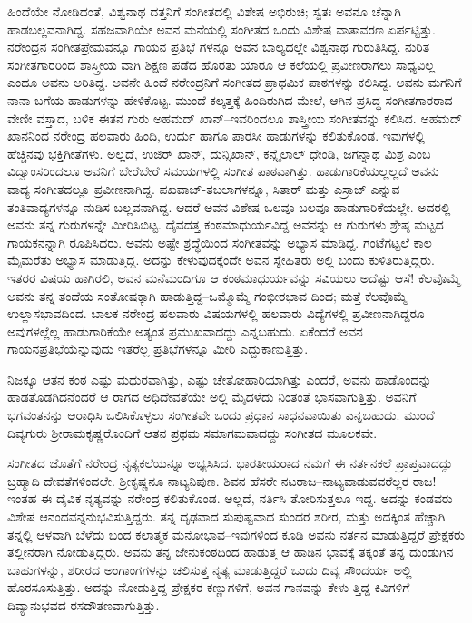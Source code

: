 ಹಿಂದೆಯೇ ನೋಡಿದಂತೆ, ವಿಶ್ವನಾಥ ದತ್ತನಿಗೆ ಸಂಗೀತದಲ್ಲಿ ವಿಶೇಷ ಅಭಿರುಚಿ; ಸ್ವತಃ ಅವನೂ ಚೆನ್ನಾಗಿ ಹಾಡಬಲ್ಲವನಾಗಿದ್ದ. ಸಹಜವಾಗಿಯೇ ಅವನ ಮನೆಯಲ್ಲಿ ಸಂಗೀತದ ಒಂದು ವಿಶೇಷ ವಾತಾವರಣ ಏರ್ಪಟ್ಟಿತ್ತು. ನರೇಂದ್ರನ ಸಂಗೀತಪ್ರೇಮವನ್ನೂ ಗಾಯನ ಪ್ರತಿಭೆ ಗಳನ್ನೂ ಅವನ ಬಾಲ್ಯದಲ್ಲೇ ವಿಶ್ವನಾಥ ಗುರುತಿಸಿದ್ದ. ನುರಿತ ಸಂಗೀತಗಾರರಿಂದ ಶಾಸ್ತ್ರೀಯ ವಾಗಿ ಶಿಕ್ಷಣ ಪಡೆದ ಹೊರತು ಯಾರೂ ಆ ಕಲೆಯಲ್ಲಿ ಪ್ರವೀಣರಾಗಲು ಸಾಧ್ಯವಿಲ್ಲ ಎಂದೂ ಅವನು ಅರಿತಿದ್ದ. ಅವನೇ ಹಿಂದೆ ನರೇಂದ್ರನಿಗೆ ಸಂಗೀತದ ಪ್ರಾಥಮಿಕ ಪಾಠಗಳನ್ನು ಕಲಿಸಿದ್ದ. ಅವನು ಮಗನಿಗೆ ನಾನಾ ಬಗೆಯ ಹಾಡುಗಳನ್ನು ಹೇಳಿಕೊಟ್ಟ. ಮುಂದೆ ಕಲ್ಕತ್ತಕ್ಕೆ ಹಿಂದಿರುಗಿದ ಮೇಲೆ, ಆಗಿನ ಪ್ರಸಿದ್ಧ ಸಂಗೀತಗಾರರಾದ ವೇಣೀ ವಸ್ತಾದ, ಬಳಿಕ ಈತನ ಗುರು ಅಹಮದ್ ಖಾನ್​–ಇವರಿಂದಲೂ ಶಾಸ್ತ್ರೀಯ ಸಂಗೀತವನ್ನು ಕಲಿಸಿದ. ಅಹಮದ್ ಖಾನನಿಂದ ನರೇಂದ್ರ ಹಲವಾರು ಹಿಂದಿ, ಉರ್ದು ಹಾಗೂ ಪಾರಸೀ ಹಾಡುಗಳನ್ನು ಕಲಿತುಕೊಂಡ. ಇವುಗಳಲ್ಲಿ ಹೆಚ್ಚಿನವು ಭಕ್ತಿಗೀತೆಗಳು. ಅಲ್ಲದೆ, ಉಜಿರ್ ಖಾನ್, ದುನ್ನಿಖಾನ್, ಕನ್ನೈಲಾಲ್ ಧೇಂಡಿ, ಜಗನ್ನಾಥ ಮಿಶ್ರ ಎಂಬ ವಿದ್ವಾಂಸರಿಂದಲೂ ಅವನಿಗೆ ಬೇರೆಬೇರೆ ಸಮಯಗಳಲ್ಲಿ ಸಂಗೀತ ಪಾಠವಾಗಿತ್ತು. ಹಾಡುಗಾರಿಕೆಯಲ್ಲಲ್ಲದೆ ಅವನು ವಾದ್ಯ ಸಂಗೀತದಲ್ಲೂ ಪ್ರವೀಣನಾಗಿದ್ದ. ಪಖವಾಜ್​-ತಬಲಾಗಳನ್ನೂ, ಸಿತಾರ್ ಮತ್ತು ಎಸ್ರಾಜ್ ಎನ್ನುವ ತಂತಿವಾದ್ಯಗಳನ್ನೂ ನುಡಿಸ ಬಲ್ಲವನಾಗಿದ್ದ. ಆದರೆ ಅವನ ವಿಶೇಷ ಒಲವೂ ಬಲವೂ ಹಾಡುಗಾರಿಕೆಯಲ್ಲೇ. ಅದರಲ್ಲಿ ಅವನು ತನ್ನ ಗುರುಗಳನ್ನೇ ಮೀರಿಸಿಬಿಟ್ಟ. ದೈವದತ್ತ ಕಂಠಮಾಧುರ್ಯವಿದ್ದ ಅವನನ್ನು ಆ ಗುರುಗಳು ಶ್ರೇಷ್ಠ ಮಟ್ಟದ ಗಾಯಕನನ್ನಾಗಿ ರೂಪಿಸಿದರು. ಅವನು ಅಷ್ಟೇ ಶ್ರದ್ಧೆಯಿಂದ ಸಂಗೀತವನ್ನು ಅಭ್ಯಾಸ ಮಾಡಿದ್ದ. ಗಂಟೆಗಟ್ಟಲೆ ಕಾಲ ಮೈಮರೆತು ಅಭ್ಯಾಸ ಮಾಡುತ್ತಿದ್ದ. ಅದನ್ನು ಕೇಳುವುದಕ್ಕೆಂದೇ ಅವನ ಸ್ನೇಹಿತರು ಅಲ್ಲಿ ಬಂದು ಕುಳಿತಿರುತ್ತಿದ್ದರು. ಇತರರ ವಿಷಯ ಹಾಗಿರಲಿ, ಅವನ ಮನೆಮಂದಿಗೂ ಆ ಕಂಠಮಾಧುರ್ಯವನ್ನು ಸವಿಯಲು ಅದೆಷ್ಟು ಆಸೆ! ಕೆಲವೊಮ್ಮೆ ಅವನು ತನ್ನ ತಂದೆಯ ಸಂತೋಷಕ್ಕಾಗಿ ಹಾಡುತ್ತಿದ್ದ–ಒಮ್ಮೊಮ್ಮೆ ಗಂಭೀರಭಾವ ದಿಂದ; ಮತ್ತೆ ಕೆಲವೊಮ್ಮೆ ಉಲ್ಲಾಸಭಾವದಿಂದ. ಬಾಲಕ ನರೇಂದ್ರ ಹಲವಾರು ವಿಷಯಗಳಲ್ಲಿ ಹಲವಾರು ವಿದ್ಯೆಗಳಲ್ಲಿ ಪ್ರವೀಣನಾಗಿದ್ದರೂ ಅವುಗಳಲ್ಲೆಲ್ಲ ಹಾಡುಗಾರಿಕೆಯೇ ಅತ್ಯಂತ ಪ್ರಮುಖವಾದದ್ದು ಎನ್ನಬಹುದು. ಏಕೆಂದರೆ ಅವನ ಗಾಯನಪ್ರತಿಭೆಯೆನ್ನುವುದು ಇತರೆಲ್ಲ ಪ್ರತಿಭೆಗಳನ್ನೂ ಮೀರಿ ಎದ್ದುಕಾಣುತ್ತಿತ್ತು.

ನಿಜಕ್ಕೂ ಆತನ ಕಂಠ ಎಷ್ಟು ಮಧುರವಾಗಿತ್ತು, ಎಷ್ಟು ಚೇತೋಹಾರಿಯಾಗಿತ್ತು ಎಂದರೆ, ಅವನು ಹಾಡೊಂದನ್ನು ಹಾಡತೊಡಗಿದನೆಂದರೆ ಆ ರಾಗದ ಅಧಿದೇವತೆಯೇ ಅಲ್ಲಿ ಮೈದಳೆದು ನಿಂತಂತೆ ಭಾಸವಾಗುತ್ತಿತ್ತು. ಅವನಿಗೆ ಭಗವಂತನನ್ನು ಆರಾಧಿಸಿ ಒಲಿಸಿಕೊಳ್ಳಲು ಸಂಗೀತವೇ ಒಂದು ಪ್ರಧಾನ ಸಾಧನವಾಯಿತು ಎನ್ನಬಹುದು. ಮುಂದೆ ದಿವ್ಯಗುರು ಶ್ರೀರಾಮಕೃಷ್ಣರೊಂದಿಗೆ ಆತನ ಪ್ರಥಮ ಸಮಾಗಮವಾದದ್ದು ಸಂಗೀತದ ಮೂಲಕವೇ.

ಸಂಗೀತದ ಜೊತೆಗೆ ನರೇಂದ್ರ ನೃತ್ಯಕಲೆಯನ್ನೂ ಅಭ್ಯಸಿಸಿದ. ಭಾರತೀಯರಾದ ನಮಗೆ ಈ ನರ್ತನಕಲೆ ಪ್ರಾಪ್ತವಾದದ್ದು ಬ್ರಹ್ಮಾದಿ ದೇವತೆಗಳಿಂದಲೇ. ಶ್ರೀಕೃಷ್ಣನೂ ನಾಟ್ಯನಿಪುಣ. ಶಿವನ ಹೆಸರೇ ನಟರಾಜ–ನಾಟ್ಯವಾಡುವವರೆಲ್ಲರ ರಾಜ! ಇಂತಹ ಈ ದೈವಿಕ ನೃತ್ಯವನ್ನು ನರೇಂದ್ರ ಕಲಿತುಕೊಂಡ. ಅಲ್ಲದೆ, ನರ್ತಿಸಿ ತೋರಿಸುತ್ತಲೂ ಇದ್ದ. ಅದನ್ನು ಕಂಡವರು ವಿಶೇಷ ಆನಂದವನ್ನನುಭವಿಸುತ್ತಿದ್ದರು. ತನ್ನ ದೃಢವಾದ ಸುಪುಷ್ಟವಾದ ಸುಂದರ ಶರೀರ, ಮತ್ತು ಅದಕ್ಕಿಂತ ಹೆಚ್ಚಾಗಿ ತನ್ನಲ್ಲಿ ಆಳವಾಗಿ ಬೆಳೆದು ಬಂದ ಕಲಾತ್ಮಕ ಮನೋಭಾವ–ಇವುಗಳಿಂದ ಕೂಡಿ ಅವನು ನರ್ತನ ಮಾಡುತ್ತಿದ್ದರೆ ಪ್ರೇಕ್ಷಕರು ತಲ್ಲೀನರಾಗಿ ನೋಡುತ್ತಿದ್ದರು. ಅವನು ತನ್ನ ಜೇನುಕಂಠದಿಂದ ಹಾಡುತ್ತ ಆ ಹಾಡಿನ ಭಾವಕ್ಕೆ ತಕ್ಕಂತೆ ತನ್ನ ದುಂಡುಗಿನ ಬಾಹುಗಳನ್ನು, ಶರೀರದ ಅಂಗಾಂಗಗಳನ್ನು ಚಲಿಸುತ್ತ ನೃತ್ಯ ಮಾಡುತ್ತಿದ್ದರೆ ಒಂದು ದಿವ್ಯ ಸೌಂದರ್ಯ ಅಲ್ಲಿ ಹೊರಸೂಸುತ್ತಿತ್ತು. ಅದನ್ನು ನೋಡುತ್ತಿದ್ದ ಪ್ರೇಕ್ಷಕರ ಕಣ್ಣುಗಳಿಗೆ, ಅವನ ಗಾನವನ್ನು ಕೇಳು ತ್ತಿದ್ದ ಕಿವಿಗಳಿಗೆ ದಿವ್ಯಾನುಭವದ ರಸದೌತಣವಾಗುತ್ತಿತ್ತು.

